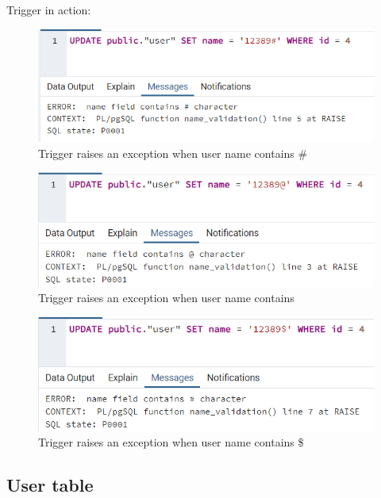 Trigger in action:
\begin{center}
    \begin{figure}[h]
        \centering
        \includegraphics[]{images/validation_1}
        \caption{Trigger raises an exception when user name contains \#}
        \label{fig:db_validation_1}
    \end{figure}

    \begin{figure}[h]
        \centering
        \includegraphics[]{images/validation_2}
        \caption{Trigger raises an exception when user name contains \@}
        \label{fig:db_validation_3}
    \end{figure}
    \begin{figure}[h]
        \centering
        \includegraphics[]{images/validation_dollar}
        \caption{Trigger raises an exception when user name contains \$}
        \label{fig:db_validation_2}
    \end{figure}
\end{center}

\clearpage\subsection{User table}\label{subsec:user-table}

